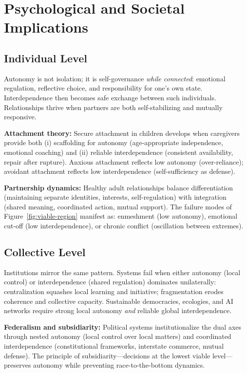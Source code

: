 \documentclass[11pt,a4paper]{article}
\begin{document}
\section{Psychological and Societal Implications}

\subsection{Individual Level}

Autonomy is not isolation; it is self-governance \emph{while connected}: emotional regulation, reflective choice, and responsibility for one's own state.
Interdependence then becomes safe exchange between such individuals.
Relationships thrive when partners are both self-stabilizing and mutually responsive.

\textbf{Attachment theory:} Secure attachment in children develops when caregivers provide both (i) scaffolding for autonomy (age-appropriate independence, emotional coaching) and (ii) reliable interdependence (consistent availability, repair after rupture). Anxious attachment reflects low autonomy (over-reliance); avoidant attachment reflects low interdependence (self-sufficiency as defense).

\textbf{Partnership dynamics:} Healthy adult relationships balance differentiation (maintaining separate identities, interests, self-regulation) with integration (shared meaning, coordinated action, mutual support). The failure modes of Figure~\ref{fig:viable-region} manifest as: enmeshment (low autonomy), emotional cut-off (low interdependence), or chronic conflict (oscillation between extremes).

\subsection{Collective Level}

Institutions mirror the same pattern.
Systems fail when either autonomy (local control) or interdependence (shared regulation) dominates unilaterally: centralization squashes local learning and initiative; fragmentation erodes coherence and collective capacity.
Sustainable democracies, ecologies, and AI networks require strong local autonomy \emph{and} reliable global interdependence.

\textbf{Federalism and subsidiarity:} Political systems institutionalize the dual axes through nested autonomy (local control over local matters) and coordinated interdependence (constitutional frameworks, interstate commerce, mutual defense). The principle of subsidiarity---decisions at the lowest viable level---preserves autonomy while preventing race-to-the-bottom dynamics.
\end{document}
